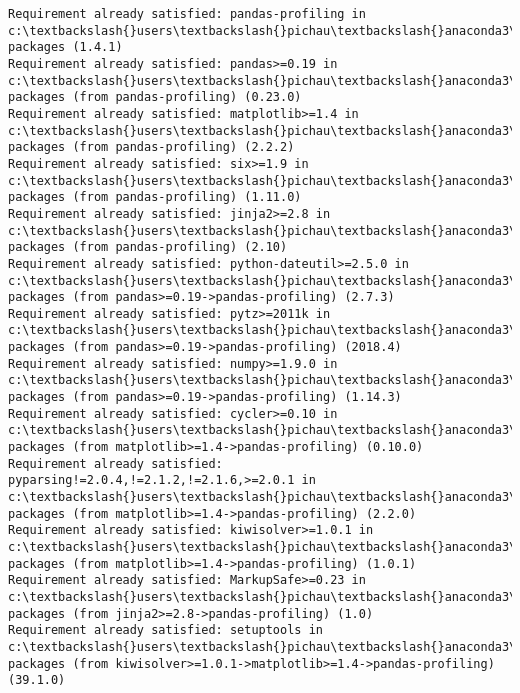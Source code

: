 \documentclass[11pt]{article}
\begin{document}
    \begin{Verbatim}[commandchars=\\\{\}]
Requirement already satisfied: pandas-profiling in c:\textbackslash{}users\textbackslash{}pichau\textbackslash{}anaconda3\textbackslash{}lib\textbackslash{}site-packages (1.4.1)
Requirement already satisfied: pandas>=0.19 in c:\textbackslash{}users\textbackslash{}pichau\textbackslash{}anaconda3\textbackslash{}lib\textbackslash{}site-packages (from pandas-profiling) (0.23.0)
Requirement already satisfied: matplotlib>=1.4 in c:\textbackslash{}users\textbackslash{}pichau\textbackslash{}anaconda3\textbackslash{}lib\textbackslash{}site-packages (from pandas-profiling) (2.2.2)
Requirement already satisfied: six>=1.9 in c:\textbackslash{}users\textbackslash{}pichau\textbackslash{}anaconda3\textbackslash{}lib\textbackslash{}site-packages (from pandas-profiling) (1.11.0)
Requirement already satisfied: jinja2>=2.8 in c:\textbackslash{}users\textbackslash{}pichau\textbackslash{}anaconda3\textbackslash{}lib\textbackslash{}site-packages (from pandas-profiling) (2.10)
Requirement already satisfied: python-dateutil>=2.5.0 in c:\textbackslash{}users\textbackslash{}pichau\textbackslash{}anaconda3\textbackslash{}lib\textbackslash{}site-packages (from pandas>=0.19->pandas-profiling) (2.7.3)
Requirement already satisfied: pytz>=2011k in c:\textbackslash{}users\textbackslash{}pichau\textbackslash{}anaconda3\textbackslash{}lib\textbackslash{}site-packages (from pandas>=0.19->pandas-profiling) (2018.4)
Requirement already satisfied: numpy>=1.9.0 in c:\textbackslash{}users\textbackslash{}pichau\textbackslash{}anaconda3\textbackslash{}lib\textbackslash{}site-packages (from pandas>=0.19->pandas-profiling) (1.14.3)
Requirement already satisfied: cycler>=0.10 in c:\textbackslash{}users\textbackslash{}pichau\textbackslash{}anaconda3\textbackslash{}lib\textbackslash{}site-packages (from matplotlib>=1.4->pandas-profiling) (0.10.0)
Requirement already satisfied: pyparsing!=2.0.4,!=2.1.2,!=2.1.6,>=2.0.1 in c:\textbackslash{}users\textbackslash{}pichau\textbackslash{}anaconda3\textbackslash{}lib\textbackslash{}site-packages (from matplotlib>=1.4->pandas-profiling) (2.2.0)
Requirement already satisfied: kiwisolver>=1.0.1 in c:\textbackslash{}users\textbackslash{}pichau\textbackslash{}anaconda3\textbackslash{}lib\textbackslash{}site-packages (from matplotlib>=1.4->pandas-profiling) (1.0.1)
Requirement already satisfied: MarkupSafe>=0.23 in c:\textbackslash{}users\textbackslash{}pichau\textbackslash{}anaconda3\textbackslash{}lib\textbackslash{}site-packages (from jinja2>=2.8->pandas-profiling) (1.0)
Requirement already satisfied: setuptools in c:\textbackslash{}users\textbackslash{}pichau\textbackslash{}anaconda3\textbackslash{}lib\textbackslash{}site-packages (from kiwisolver>=1.0.1->matplotlib>=1.4->pandas-profiling) (39.1.0)

    \end{Verbatim}
\end{document}
